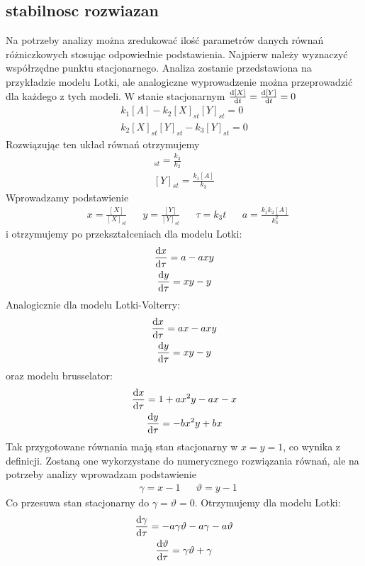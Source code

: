 \documentclass[10pt, a4paper, twoside, onecolumn]{article}
\numberwithin{equation}{section}
\begin{document}
	\subsection{stabilnosc rozwiazan}
	Na potrzeby analizy można zredukować ilość parametrów danych równań różniczkowych stosując odpowiednie podstawienia. Najpierw należy wyznaczyć współrzędne punktu stacjonarnego. Analiza zostanie przedstawiona na przykładzie modelu Lotki, ale analogiczne wyprowadzenie można przeprowadzić dla każdego z tych modeli. W stanie stacjonarnym \(\dv{[X]}{t}=\dv{[Y]}{t}=0\)
	\begin{gather}
		k_{1}[A]-k_{2}[X]_{st}[Y]_{st}=0 \\
		k_{2}[X]_{st}[Y]_{st}-k_{3}[Y]_{st}=0
	\end{gather}
	Rozwiązując ten układ równań otrzymujemy
	\begin{gather}
		[X]_{st}=\frac{k_{3}}{k_{2}} \\
		[Y]_{st}=\frac{k_{1}[A]}{k_{3}}
	\end{gather}
	Wprowadzamy podstawienie
	\begin{align*}
		& x=\frac{[X]}{[X]_{st}} && y=\frac{[Y]}{[Y]_{st}} && \tau=k_{3}t && a=\frac{k_{1}k_{2}[A]}{k_{3}^{2}}
	\end{align*}
	i otrzymujemy po przekształceniach dla modelu Lotki:
	\begin{gather}
		\dv{x}{\tau}=a-axy \\
		\dv{y}{\tau}=xy-y
	\end{gather}
	Analogicznie dla modelu Lotki-Volterry:
	\begin{gather}
		\dv{x}{\tau}=ax-axy \\
		\dv{y}{\tau}=xy-y
	\end{gather}
	oraz modelu brusselator:
	\begin{gather}
		\dv{x}{\tau}=1+ax^{2}y-ax-x \\
		\dv{y}{\tau}=-bx^{2}y+bx
	\end{gather}
	Tak przygotowane równania mają stan stacjonarny w \(x=y=1\), co wynika z definicji. Zostaną one wykorzystane do numerycznego rozwiązania równań, ale na potrzeby analizy wprowadzam podstawienie
	\begin{align*}
		& \gamma=x-1 && \vartheta=y-1
	\end{align*}
	Co przesuwa stan stacjonarny do \(\gamma=\vartheta=0\). Otrzymujemy dla modelu Lotki:
	\begin{gather}
		\dv{\gamma}{\tau}=-a\gamma\vartheta-a\gamma-a\vartheta \\
		\dv{\vartheta}{\tau}=\gamma\vartheta+\gamma
	\end{gather}
\end{document}
